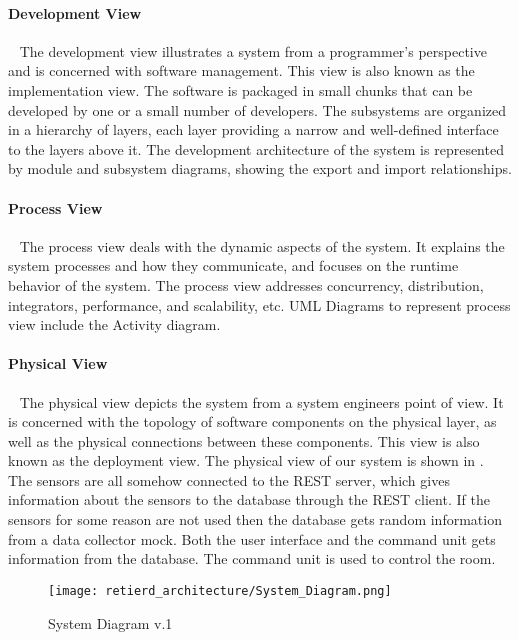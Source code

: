 \documentclass[../document]{subfiles}
\begin{document}
\paragraph{Development View} \ \newline
The development view illustrates a system from a programmer's perspective and is concerned with software management. This view is also known as the implementation view. The software is packaged in small chunks that can be developed by one or a small number of developers. The subsystems are organized in a hierarchy of layers, each layer providing a narrow and well-defined interface to the layers above it. The development architecture of the system is represented by module and subsystem diagrams, showing the export and import relationships. 
 

\paragraph{Process View} \ \newline
The process view deals with the dynamic aspects of the system. It explains the system processes and how they communicate, and focuses on the runtime behavior of the system. The process view addresses concurrency, distribution, integrators, performance, and scalability, etc. UML Diagrams to represent process view include the Activity diagram.


\paragraph{Physical View} \ \newline
The physical view depicts the system from a system engineers point of view. It is concerned with the topology of software components on the physical layer, as well as the physical connections between these components. This view is also known as the deployment view. The physical view of our system is shown in .  The sensors are all somehow connected to the REST server, which gives information about the sensors to the database through the REST client. If the sensors for some reason are not used then the database gets random information from a data collector mock. Both the user interface and the command unit gets information from the database. The command unit is used to control the room. 

\begin{figure}[H]
	\centering
	\texttt{[image: retierd\_architecture/System\_Diagram.png]}
	\caption{System Diagram v.1}
	\label{fig:System_Diagram}
\end{figure}
\end{document}
